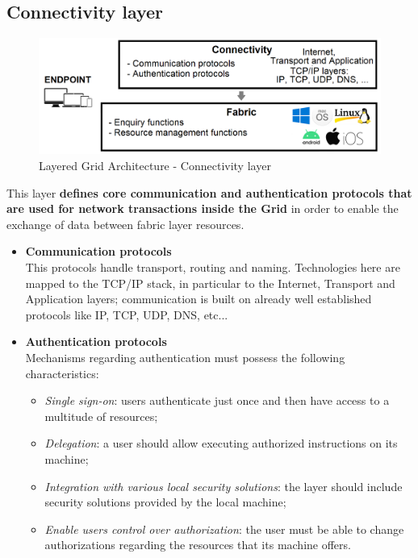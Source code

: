 \subsection{Connectivity layer}\label{connectivity_layer}
\begin{figure}[!ht]
    \centering
    \includegraphics[scale=0.35]{document/chapters/chapter_2/images/connectivity_layer.png}
    \caption{Layered Grid Architecture - Connectivity layer}
    \label{fig:connectivity_layer}
\end{figure}
\vspace{5mm}

\noindent This layer \textbf{defines core communication and authentication protocols that are used for network transactions inside the Grid} in order to enable the exchange of data between fabric layer resources.
\begin{itemize}
    \item \textbf{Communication protocols}\\
    This protocols handle transport, routing and naming. Technologies here are mapped to the TCP/IP stack, in particular to the Internet, Transport and Application layers; communication is built on already well established protocols like IP, TCP, UDP, DNS, etc... 
    \item \textbf{Authentication protocols}\\
    Mechanisms regarding authentication must possess the following characteristics:
    \begin{itemize}
        \item \textit{Single sign-on}: users authenticate just once and then have access to a multitude of resources;
        \item \textit{Delegation}: a user should allow executing authorized instructions on its machine; 
        \item \textit{Integration with various local security solutions}: the layer should include security solutions provided by the local machine;
        \item \textit{Enable users control over authorization}: the user must be able to change authorizations regarding the resources that its machine offers.
    \end{itemize}
\end{itemize}

